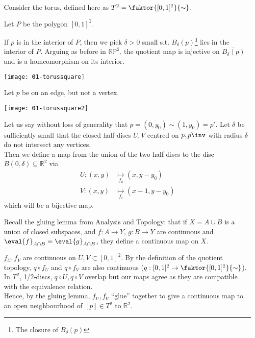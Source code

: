 \begin{example}
	Consider the torus, defined here as $T^2 = \faktor{[0,1]^2}{\sim}$.
	\begin{center}
	\end{center}
	Let $P$ be the polygon $[0,1]^2$.

	If $p$ is in the interior of $P$, then we pick $\delta > 0$ small s.t. $\overline{B_{\delta}(p)}$\footnote{The closure of $B_\delta(p)$} lies in the interior of $P$.
	Arguing as before in $\mathbb{R} \mathbb{P}^2$, the quotient map is injective on $\overline{B_{\delta}(p)}$ and is a homeomorphism on its interior.
	{ 	\par
		\centering 
		\texttt{[image: 01-torussquare]} 
		\par
	}

	Let $p$ be on an edge, but not a vertex.
	{ 	\par
		\centering 
		\texttt{[image: 01-torussquare2]} 
		\par
	}
	Let us say without loss of generality that $p = (0,y_0) \sim (1,y_0) = p'$.
	Let $\delta$ be sufficiently small that the closed half-discs $U, V$ centred on $p, p\inv$ with radius $\delta$ do not intersect any vertices. \\
	Then we define a map from the union of the two half-discs to the disc $B(0,\delta) \subseteq \mathbb R^2$ via 
	\begin{align*}
		U : (x,y) &\underset{f_u}{\mapsto} (x,y-y_0) \\
		V : (x,y) &\underset{f_v}{\mapsto} (x-1,y-y_0)
	\end{align*} which will be a bijective map.

	Recall the gluing lemma from Analysis and Topology: that if $X = A \cup B$ is a union of closed subspaces, and $f : A \to Y$, $g : B \to Y$ are continuous and $\eval{f}_{A \cap B} = \eval{g}_{A \cap B}$, they define a continuous map on $X$.

	$f_U, f_V$ are continuous on $U, V \subset [0, 1]^2$.
	By the definition of the quotient topology, $q \circ f_U$ and $q \circ f_V$ are also continuous ($q: [0, 1]^2 \to \faktor{[0, 1]^2}{\sim}$). \\
	In $T^2$, 1/2-discs, $q \circ U, q \circ V$ overlap but our maps agree as they are compatible with the equivalence relation. \\
	Hence, by the gluing lemma, $f_U, f_V$ ``glue'' together to give a continuous map to an open neighbourhood of $[p] \in T^2$ to $\mathbb{R}^2$.


\end{example}

